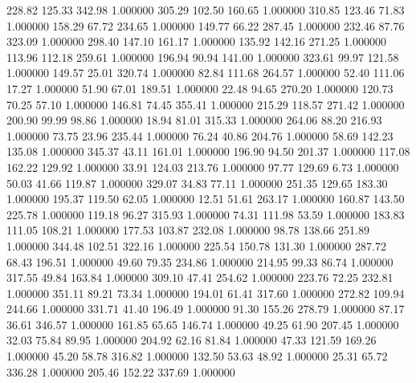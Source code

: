     228.82    125.33    342.98  1.000000
    305.29    102.50    160.65  1.000000
    310.85    123.46     71.83  1.000000
    158.29     67.72    234.65  1.000000
    149.77     66.22    287.45  1.000000
    232.46     87.76    323.09  1.000000
    298.40    147.10    161.17  1.000000
    135.92    142.16    271.25  1.000000
    113.96    112.18    259.61  1.000000
    196.94     90.94    141.00  1.000000
    323.61     99.97    121.58  1.000000
    149.57     25.01    320.74  1.000000
     82.84    111.68    264.57  1.000000
     52.40    111.06     17.27  1.000000
     51.90     67.01    189.51  1.000000
     22.48     94.65    270.20  1.000000
    120.73     70.25     57.10  1.000000
    146.81     74.45    355.41  1.000000
    215.29    118.57    271.42  1.000000
    200.90     99.99     98.86  1.000000
     18.94     81.01    315.33  1.000000
    264.06     88.20    216.93  1.000000
     73.75     23.96    235.44  1.000000
     76.24     40.86    204.76  1.000000
     58.69    142.23    135.08  1.000000
    345.37     43.11    161.01  1.000000
    196.90     94.50    201.37  1.000000
    117.08    162.22    129.92  1.000000
     33.91    124.03    213.76  1.000000
     97.77    129.69      6.73  1.000000
     50.03     41.66    119.87  1.000000
    329.07     34.83     77.11  1.000000
    251.35    129.65    183.30  1.000000
    195.37    119.50     62.05  1.000000
     12.51     51.61    263.17  1.000000
    160.87    143.50    225.78  1.000000
    119.18     96.27    315.93  1.000000
     74.31    111.98     53.59  1.000000
    183.83    111.05    108.21  1.000000
    177.53    103.87    232.08  1.000000
     98.78    138.66    251.89  1.000000
    344.48    102.51    322.16  1.000000
    225.54    150.78    131.30  1.000000
    287.72     68.43    196.51  1.000000
     49.60     79.35    234.86  1.000000
    214.95     99.33     86.74  1.000000
    317.55     49.84    163.84  1.000000
    309.10     47.41    254.62  1.000000
    223.76     72.25    232.81  1.000000
    351.11     89.21     73.34  1.000000
    194.01     61.41    317.60  1.000000
    272.82    109.94    244.66  1.000000
    331.71     41.40    196.49  1.000000
     91.30    155.26    278.79  1.000000
     87.17     36.61    346.57  1.000000
    161.85     65.65    146.74  1.000000
     49.25     61.90    207.45  1.000000
     32.03     75.84     89.95  1.000000
    204.92     62.16     81.84  1.000000
     47.33    121.59    169.26  1.000000
     45.20     58.78    316.82  1.000000
    132.50     53.63     48.92  1.000000
     25.31     65.72    336.28  1.000000
    205.46    152.22    337.69  1.000000
